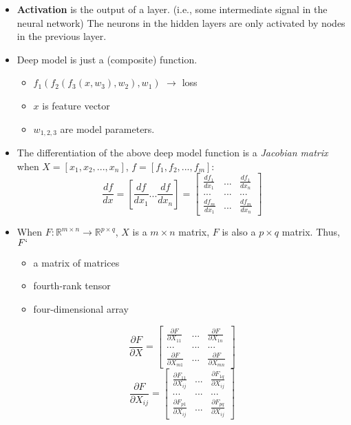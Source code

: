 \documentclass[]{article}
\begin{document}
\begin{itemize}
	\item \textbf{Activation} is the output of a layer. (i.e., some intermediate signal in the neural network) The neurons in the hidden layers are only activated by nodes in the previous layer.
	
	\item Deep model is just a (composite) function.
	\begin{itemize}
		\item $f_1(f_2(f_3(x,w_3),w_2),w_1)$ $\rightarrow$ loss
		\item $x$ is feature vector
		\item $w_{1,2,3}$ are model parameters. 
	\end{itemize}

	\item The differentiation of the above deep model function is a \textit{Jacobian matrix} when $X=[x_1,x_2,...,x_n]$, $f=[f_1,f_2,...,f_m]$:
	\begin{equation}
	\frac{df}{dx}=\left[\frac{df}{dx_1}...\frac{df}{dx_n}\right]=\left[\begin{array}{ccc}
	\frac{df_1}{dx_1}&...&\frac{df_1}{dx_n}\\
	...&...&...\\
	\frac{df_m}{dx_1}&...&\frac{df_m}{dx_n}
	\end{array}\right]
	\end{equation}
	
	\item When $F:\mathbb{R}^{m\times n}\rightarrow \mathbb{R}^{p\times q}$, $X$ is a $m\times n$ matrix, $F$ is also a $p\times q$ matrix. Thus, $F`$ 
	\begin{itemize}
		\item a matrix of matrices
		\item fourth-rank tensor
		\item four-dimensional array
	\end{itemize} 
	\begin{equation}
	\frac{\partial F}{\partial X}=\left[\begin{array}{ccc}
	\frac{\partial F}{\partial X_{11}}&...&\frac{\partial F}{\partial X_{1n}}\\
	...&...&...\\
	\frac{\partial F}{\partial X_{m1}}&...&\frac{\partial F}{\partial X_{mn}}
	\end{array}\right]
	\end{equation}
	\begin{equation}
	\frac{\partial F}{\partial X_{ij}}=\left[\begin{array}{ccc}
	\frac{\partial F_{11}}{\partial X_{ij}}&...&\frac{\partial F_{1q}}{\partial X_{ij}}\\
	...&...&...\\
	\frac{\partial F_{p1}}{\partial X_{ij}}&...&\frac{\partial F_{pq}}{\partial X_{ij}}
	\end{array}\right]
	\end{equation}
\end{itemize}
\end{document}
